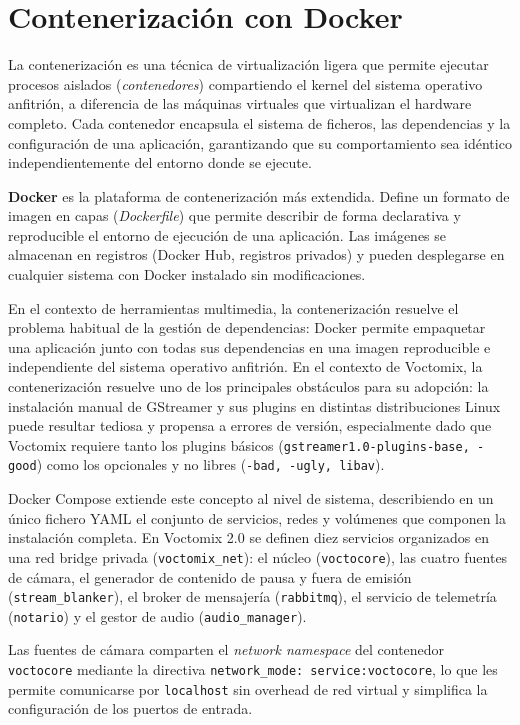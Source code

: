 \section{Contenerización con Docker}

La contenerización es una técnica de virtualización ligera que permite ejecutar
procesos aislados (\textit{contenedores}) compartiendo el kernel del sistema operativo
anfitrión, a diferencia de las máquinas virtuales que virtualizan el hardware completo.
Cada contenedor encapsula el sistema de ficheros, las dependencias y la configuración
de una aplicación, garantizando que su comportamiento sea idéntico independientemente
del entorno donde se ejecute.

\textbf{Docker} es la plataforma de contenerización más extendida. Define un formato
de imagen en capas (\textit{Dockerfile}) que permite describir de forma declarativa
y reproducible el entorno de ejecución de una aplicación. Las imágenes se almacenan
en registros (Docker Hub, registros privados) y pueden desplegarse en cualquier sistema
con Docker instalado sin modificaciones.

En el contexto de herramientas multimedia, la contenerización resuelve el problema
habitual de la gestión de dependencias: Docker permite empaquetar una aplicación junto con todas sus dependencias en una
imagen reproducible e independiente del sistema operativo anfitrión. En el contexto
de Voctomix, la contenerización resuelve uno de los principales obstáculos para su
adopción: la instalación manual de GStreamer y sus plugins en distintas distribuciones
Linux puede resultar tediosa y propensa a errores de versión, especialmente dado que
Voctomix requiere tanto los plugins básicos (\texttt{gstreamer1.0-plugins-base, -good})
como los opcionales y no libres (\texttt{-bad, -ugly, libav}).

Docker Compose extiende este concepto al nivel de sistema, describiendo en un único
fichero YAML el conjunto de servicios, redes y volúmenes que componen la instalación
completa. En Voctomix 2.0 se definen diez servicios organizados en una red bridge
privada (\texttt{voctomix\_net}): el núcleo (\texttt{voctocore}), las cuatro fuentes de
cámara, el generador de contenido de pausa y fuera de emisión (\texttt{stream\_blanker}),
el broker de mensajería (\texttt{rabbitmq}), el servicio de telemetría (\texttt{notario})
y el gestor de audio (\texttt{audio\_manager}).

Las fuentes de cámara comparten el \textit{network namespace} del contenedor
\texttt{voctocore} mediante la directiva \texttt{network\_mode: service:voctocore},
lo que les permite comunicarse por \texttt{localhost} sin overhead de red virtual y
simplifica la configuración de los puertos de entrada.

